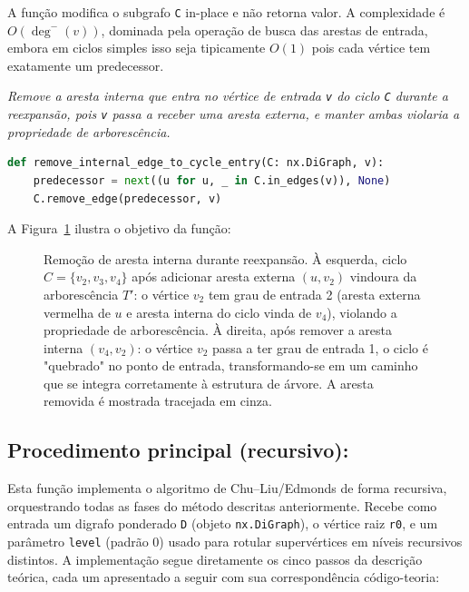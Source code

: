 A função modifica o subgrafo \texttt{C} in-place e não retorna valor. A complexidade é \(O(\deg^-(v))\), dominada pela operação de busca das arestas de entrada, embora em ciclos simples isso seja tipicamente \(O(1)\) pois cada vértice tem exatamente um predecessor.

\begin{tcolorbox}[
        enhanced, breakable,
        colframe=blue!60!black, colback=blue!2,
        colbacktitle=blue!15, coltitle=black,
        title={Remover arco interno na reexpansão},
        boxed title style={sharp corners, boxrule=0.6pt},
        sharp corners, boxrule=0.6pt
    ]
    \emph{Remove a aresta interna que entra no vértice de entrada \texttt{v} do ciclo \texttt{C} durante a reexpansão, pois \texttt{v} passa a receber uma aresta externa, e manter ambas violaria a propriedade de arborescência.}
    \tcblower
    \begin{lstlisting}[mathescape=true, language=Python]
def remove_internal_edge_to_cycle_entry(C: nx.DiGraph, v):
    predecessor = next((u for u, _ in C.in_edges(v)), None)
    C.remove_edge(predecessor, v) 
\end{lstlisting}
\end{tcolorbox}

A Figura~\ref{fig:remove-internal-edge-example} ilustra o objetivo da função:

\begin{figure}[H]
    \centering
    
    \caption{Remoção de aresta interna durante reexpansão. À esquerda, ciclo $C=\{v_2, v_3, v_4\}$ após adicionar aresta externa $(u, v_2)$ vindoura da arborescência $T'$: o vértice $v_2$ tem grau de entrada 2 (aresta externa vermelha de $u$ e aresta interna do ciclo vinda de $v_4$), violando a propriedade de arborescência. À direita, após remover a aresta interna $(v_4, v_2)$: o vértice $v_2$ passa a ter grau de entrada 1, o ciclo é "quebrado" no ponto de entrada, transformando-se em um caminho que se integra corretamente à estrutura de árvore. A aresta removida é mostrada tracejada em cinza.}
    \label{fig:remove-internal-edge-example}
\end{figure}

\subsection{Procedimento principal (recursivo):}
Esta função implementa o algoritmo de Chu–Liu/Edmonds de forma recursiva, orquestrando todas as fases do método descritas anteriormente. Recebe como entrada um digrafo ponderado \texttt{D} (objeto \texttt{nx.DiGraph}), o vértice raiz \texttt{r0}, e um parâmetro \texttt{level} (padrão 0) usado para rotular supervértices em níveis recursivos distintos. A implementação segue diretamente os cinco passos da descrição teórica, cada um apresentado a seguir com sua correspondência código-teoria:

